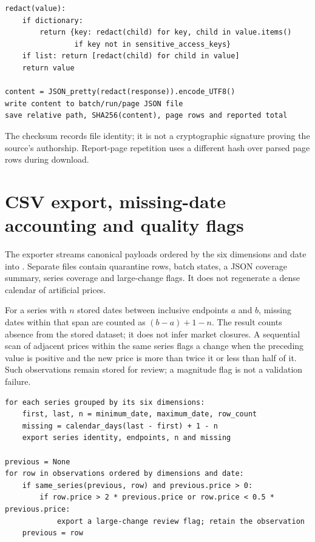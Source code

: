 \documentclass[12pt,a4paper,oneside]{report}
\numberwithin{equation}{chapter}
\numberwithin{figure}{chapter}
\numberwithin{table}{chapter}
\theoremstyle{definition}
\begin{document}
\begin{lstlisting}[caption={Algorithm: redact access material before archiving}]
redact(value):
    if dictionary:
        return {key: redact(child) for key, child in value.items()
                if key not in sensitive_access_keys}
    if list: return [redact(child) for child in value]
    return value

content = JSON_pretty(redact(response)).encode_UTF8()
write content to batch/run/page JSON file
save relative path, SHA256(content), page rows and reported total
\end{lstlisting}

The checksum records file identity; it is not a cryptographic signature proving the source's authorship. Report-page repetition uses a different hash over parsed page rows during download.

\section{CSV export, missing-date accounting and quality flags}
The exporter streams canonical payloads ordered by the six dimensions and date into . Separate files contain quarantine rows, batch states, a JSON coverage summary, series coverage and large-change flags. It does not regenerate a dense calendar of artificial prices.

For a series with $n$ stored dates between inclusive endpoints $a$ and $b$, missing dates within that span are counted as $(b-a)+1-n$. The result counts absence from the stored dataset; it does not infer market closures. A sequential scan of adjacent prices within the same series flags a change when the preceding value is positive and the new price is more than twice it or less than half of it. Such observations remain stored for review; a magnitude flag is not a validation failure.

\begin{lstlisting}[caption={Algorithm: stream missing-date counts and review flags}]
for each series grouped by its six dimensions:
    first, last, n = minimum_date, maximum_date, row_count
    missing = calendar_days(last - first) + 1 - n
    export series identity, endpoints, n and missing

previous = None
for row in observations ordered by dimensions and date:
    if same_series(previous, row) and previous.price > 0:
        if row.price > 2 * previous.price or row.price < 0.5 * previous.price:
            export a large-change review flag; retain the observation
    previous = row
\end{lstlisting}
\end{document}
